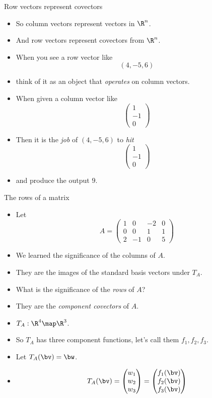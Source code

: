 \documentclass{beamer}
\begin{document}
\begin{frame}{Row vectors represent covectors}
\begin{itemize}
\item So column vectors represent vectors in $\R^n$.
\item And row vectors represent covectors from $\R^n$.
\item When you see a row vector like
$$(4, -5, 6)$$
\item think of it as an object that \emph{operates} on column vectors.
\item When given a column vector like
$$
\begin{pmatrix}
1 \\ -1 \\ 0
\end{pmatrix}
$$
\item Then it is the \emph{job} of $(4, -5, 6)$ to \emph{hit}
$$
\begin{pmatrix}
1 \\ -1 \\ 0
\end{pmatrix}
$$
\item and produce the output $9$.
\end{itemize}
\end{frame}


\begin{frame}{The rows of a matrix}
\begin{itemize}
\item Let
$$A =
\begin{pmatrix}
1 &  0 & -2 & 0 \\
0 &  0 &  1 & 1 \\
2 & -1 &  0 & 5
\end{pmatrix}
$$
\item We learned the significance of the columns of $A$.
\item They are the images of the standard basis vectors under $T_A$.
\item What is the significance of the \emph{rows} of $A$?
\item They are the \emph{component covectors} of $A$.
\item $T_A:\R^4\map\R^3$.
\item So $T_A$ has three component functions, let's call them $f_1, f_2, f_3$.
\item Let $T_A(\bv) = \bw$.
\item
$$T_A(\bv) =
\begin{pmatrix}
w_1 \\ w_2 \\ w_3
\end{pmatrix}
=
\begin{pmatrix}
f_1(\bv) \\ f_2(\bv) \\ f_3(\bv)
\end{pmatrix}
$$
\end{itemize}
\end{frame}
\end{document}
